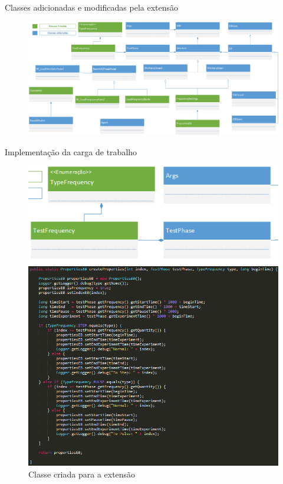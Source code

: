\begin{frame}{Classes adicionadas e modificadas pela extensão}
	\begin{figure}[htb]
		\centering
		\includegraphics[scale=0.3]{../monograph/images/diagrama-classes-beanch4Q.png}	
	\end{figure}
\end{frame}

\begin{frame}{Implementação da carga de trabalho}
	\begin{figure}
		\centering
		\begin{minipage}{.3\textwidth}
			\centering
			\includegraphics[scale=0.23]{images/diagram-code1.png}	
		\end{minipage}
		\begin{minipage}{.6\textwidth}
			\centering
			\includegraphics[scale=0.35]{images/code1.png} 
		\end{minipage}
		\caption{Classe criada para a extensão}
	\end{figure}
	
\end{frame}

